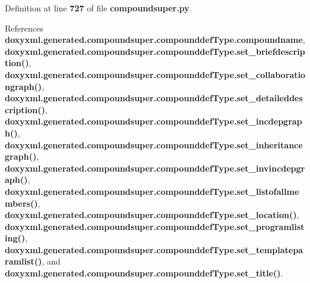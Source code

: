 Definition at line {\bf 727} of file {\bf compoundsuper.\+py}.



References {\bf doxyxml.\+generated.\+compoundsuper.\+compounddef\+Type.\+compoundname}, {\bf doxyxml.\+generated.\+compoundsuper.\+compounddef\+Type.\+set\+\_\+briefdescription()}, {\bf doxyxml.\+generated.\+compoundsuper.\+compounddef\+Type.\+set\+\_\+collaborationgraph()}, {\bf doxyxml.\+generated.\+compoundsuper.\+compounddef\+Type.\+set\+\_\+detaileddescription()}, {\bf doxyxml.\+generated.\+compoundsuper.\+compounddef\+Type.\+set\+\_\+incdepgraph()}, {\bf doxyxml.\+generated.\+compoundsuper.\+compounddef\+Type.\+set\+\_\+inheritancegraph()}, {\bf doxyxml.\+generated.\+compoundsuper.\+compounddef\+Type.\+set\+\_\+invincdepgraph()}, {\bf doxyxml.\+generated.\+compoundsuper.\+compounddef\+Type.\+set\+\_\+listofallmembers()}, {\bf doxyxml.\+generated.\+compoundsuper.\+compounddef\+Type.\+set\+\_\+location()}, {\bf doxyxml.\+generated.\+compoundsuper.\+compounddef\+Type.\+set\+\_\+programlisting()}, {\bf doxyxml.\+generated.\+compoundsuper.\+compounddef\+Type.\+set\+\_\+templateparamlist()}, and {\bf doxyxml.\+generated.\+compoundsuper.\+compounddef\+Type.\+set\+\_\+title()}.



